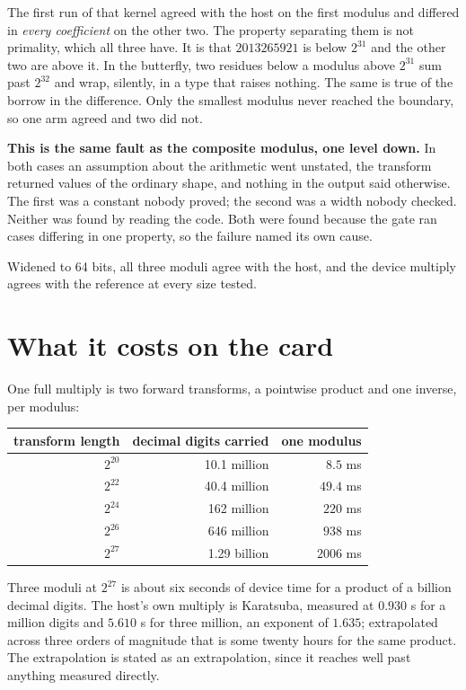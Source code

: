 The first run of that kernel agreed with the host on the first modulus and differed in \emph{every coefficient} on the other two. The property separating them is not primality, which all three have. It is that \(2013265921\) is below \(2^{31}\) and the other two are above it. In the butterfly, two residues below a modulus above \(2^{31}\) sum past \(2^{32}\) and wrap, silently, in a type that raises nothing. The same is true of the borrow in the difference. Only the smallest modulus never reached the boundary, so one arm agreed and two did not.

\textbf{This is the same fault as the composite modulus, one level down.} In both cases an assumption about the arithmetic went unstated, the transform returned values of the ordinary shape, and nothing in the output said otherwise. The first was a constant nobody proved; the second was a width nobody checked. Neither was found by reading the code. Both were found because the gate ran cases differing in one property, so the failure named its own cause.

Widened to 64 bits, all three moduli agree with the host, and the device multiply agrees with the reference at every size tested.

\section{What it costs on the card}

One full multiply is two forward transforms, a pointwise product and one inverse, per modulus:

\begin{center}
\begin{tabular}{@{}rrr@{}}
\toprule
transform length & decimal digits carried & one modulus \\
\midrule
\(2^{20}\) & 10.1 million & \(8.5\) ms \\
\(2^{22}\) & 40.4 million & \(49.4\) ms \\
\(2^{24}\) & 162 million & \(220\) ms \\
\(2^{26}\) & 646 million & \(938\) ms \\
\(2^{27}\) & 1.29 billion & \(2006\) ms \\
\bottomrule
\end{tabular}
\end{center}

Three moduli at \(2^{27}\) is about six seconds of device time for a product of a billion decimal digits. The host's own multiply is Karatsuba, measured at \(0.930\) s for a million digits and \(5.610\) s for three million, an exponent of \(1.635\); extrapolated across three orders of magnitude that is some twenty hours for the same product. The extrapolation is stated as an extrapolation, since it reaches well past anything measured directly.

